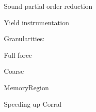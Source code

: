 Sound partial order reduction

Yield instrumentation

Granularities:

Full-force

Coarse

MemoryRegion

Speeding up Corral

